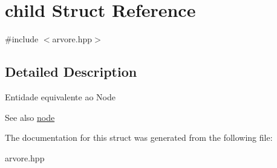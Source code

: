 \hypertarget{structchild}{}\section{child Struct Reference}
\label{structchild}


{\ttfamily \#include $<$arvore.\+hpp$>$}



\subsection{Detailed Description}
Entidade equivalente ao Node \begin{DoxySeeAlso}{See also}
\hyperlink{structnode}{node} 
\end{DoxySeeAlso}


The documentation for this struct was generated from the following file\+:\begin{DoxyCompactItemize}
\item 
arvore.\+hpp\end{DoxyCompactItemize}
